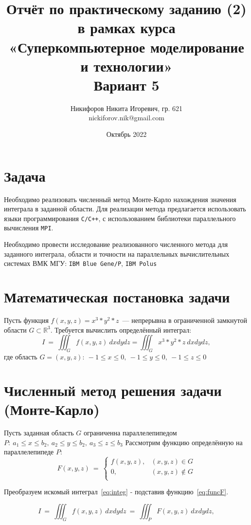 \documentclass{article}
\title{Отчёт по практическому заданию (2) в рамках курса\\«Суперкомпьютерное моделирование и технологии»\\Вариант 5}
\author{Никифоров Никита Игоревич, гр. 621\\nickiforov.nik@gmail.com}
\date{Октябрь 2022}
\begin{document}
\maketitle
\newpage
\section{Задача}
    Необходимо реализовать численный метод Монте-Карло нахождения значения интеграла
    в заданной области. Для реализации метода предлагается использовать языки программирования 
    {\tt C/C++}, с использованием библиотеки параллельного вычисления {\tt MPI}.

    Необходимо провести исследование реализованного численного метода для
    заданного интеграла, области и точности 
    на параллельных вычислительных системах ВМК МГУ: {\tt IBM Blue Gene/P}, {\tt IBM Polus}
\section{Математическая постановка задачи}
    Пусть функция \(f(x, y, z) = x^3*y^2*z\)~--- непрерывна в ограниченной замкнутой области \(G \subset \mathbb{R}^3\).
    Требуется вычислить определённый интеграл:
    \begin{equation}
        I\ =\ \iiint_G f(x, y, z)\ dxdydz = \iiint_G x^3*y^2*z\ dxdydz,
        \label{eq:integ}
    \end{equation}
    где область \(G={(x,y,z):\ −1 \leq x \leq 0,\ −1\leq y \leq 0,\ −1\leq z \leq 0}\)
\section{Численный метод решения задачи (Монте-Карло)}
    Пусть заданная область \(G\) ограниченна параллелепипедом \(P:\ a_1 \leq x \leq b_2,\ a_2 \leq y \leq b_2,\ a_3 \leq z \leq b_3\)
    Рассмотрим функцию определённую на параллелепипеде \(P\):
    \begin{equation}
        F(x, y, z)\ =\
        \begin{cases}
            f(x, y, z), & (x, y, z) \in G\\
            0         , & (x, y, z) \notin G\\
        \end{cases}
        \label{eq:funcF}
    \end{equation}

    Преобразуем искомый интеграл~\ref{eq:integ} - подставив функцию~\ref{eq:funcF}.
    
    \begin{equation}
        I\ =\ \iiint_G f(x, y, z)\ dxdydz\ =\ \iiint_P F(x, y, z)\ dxdydz,
        \label{eq:integF}
    \end{equation}
\end{document}
